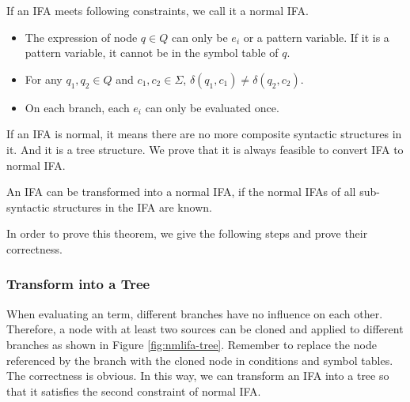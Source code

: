 \begin{Def}
\label{def:nmlifa}
If an IFA meets following constraints, we call it a normal IFA.
\begin{itemize}
    \item The expression of node $q \in Q$ can only be $e_i$ or a pattern variable. If it is a pattern variable, it cannot be in the symbol table of $q$.
    \item For any $q_1,q_2 \in Q$ and $c_1, c_2 \in \Sigma$, $\delta(q_1, c_1) \neq \delta(q_2, c_2)$.
    \item On each branch, each $e_i$ can only be evaluated once.
\end{itemize}
\end{Def}

If an IFA is normal, it means there are no more composite syntactic structures in it. And it is a tree structure. We  prove that it is always feasible to convert IFA to normal IFA.

\begin{mythm}
\label{mythm:nmlifa}
An IFA can be transformed into a normal IFA, if the normal IFAs of all sub-syntactic structures in the IFA are known.
\end{mythm}

In order to prove this theorem, we give the following steps and prove their correctness.

\subsubsection{Transform into a Tree}

When evaluating an term, different branches have no influence on each other. Therefore, a node with at least two sources can be cloned and applied to different branches as shown in Figure \ref{fig:nmlifa-tree}. Remember to replace the node referenced by the branch with the cloned node in conditions and symbol tables. The correctness is obvious. In this way, we can transform an IFA into a tree so that it satisfies the second constraint of normal IFA.

